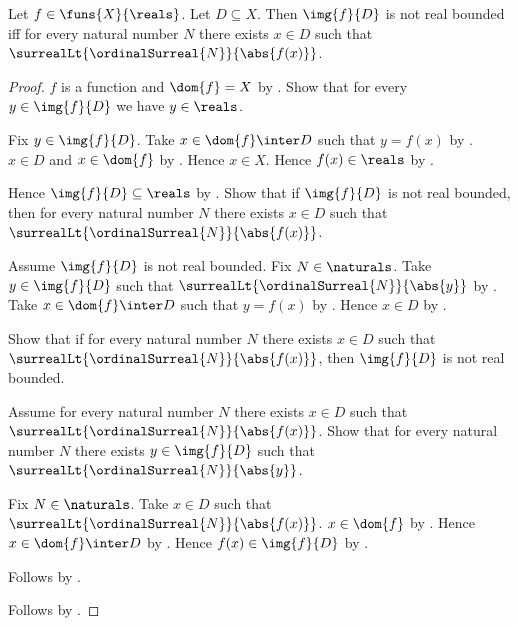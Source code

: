 \begin{corollary}\label{function_image_unbounded_iff_large_values}
    Let $f\in\funs{X}{\reals}$.
    Let $D\subseteq X$.
    Then $\img{f}{D}$ is not real bounded iff for every natural number
        $N$ there exists $x\in D$ such that
            $\surrealLt{\ordinalSurreal{N}}{\abs{f(x)}}$.
\end{corollary}
\begin{proof}
    $f$ is a function and $\dom{f}=X$ by
        .
    Show that for every $y\in\img{f}{D}$ we have $y\in\reals$.
    \begin{subproof}
        Fix $y\in\img{f}{D}$.
        Take $x\in\dom{f}\inter D$ such that $y=f(x)$ by
            .
        $x\in D$ and $x\in\dom{f}$ by .
        Hence $x\in X$.
        Hence $f(x)\in\reals$ by .
    \end{subproof}
    Hence $\img{f}{D}\subseteq\reals$ by .
    Show that if $\img{f}{D}$ is not real bounded, then for every
        natural number $N$ there exists $x\in D$ such that
            $\surrealLt{\ordinalSurreal{N}}{\abs{f(x)}}$.
    \begin{subproof}
        Assume $\img{f}{D}$ is not real bounded.
        Fix $N\in\naturals$.
        Take $y\in\img{f}{D}$ such that
            $\surrealLt{\ordinalSurreal{N}}{\abs{y}}$
            by .
        Take $x\in\dom{f}\inter D$ such that $y=f(x)$ by
            .
        Hence $x\in D$ by .
    \end{subproof}
    Show that if for every natural number $N$ there exists $x\in D$
        such that $\surrealLt{\ordinalSurreal{N}}{\abs{f(x)}}$, then
        $\img{f}{D}$ is not real bounded.
    \begin{subproof}
        Assume for every natural number $N$ there exists $x\in D$
            such that $\surrealLt{\ordinalSurreal{N}}{\abs{f(x)}}$.
        Show that for every natural number $N$ there exists
            $y\in\img{f}{D}$ such that
                $\surrealLt{\ordinalSurreal{N}}{\abs{y}}$.
        \begin{subproof}
            Fix $N\in\naturals$.
            Take $x\in D$ such that
                $\surrealLt{\ordinalSurreal{N}}{\abs{f(x)}}$.
            $x\in\dom{f}$ by .
            Hence $x\in\dom{f}\inter D$ by .
            Hence $f(x)\in\img{f}{D}$ by
                .
        \end{subproof}
        Follows by .
    \end{subproof}
    Follows by \auto.
\end{proof}

